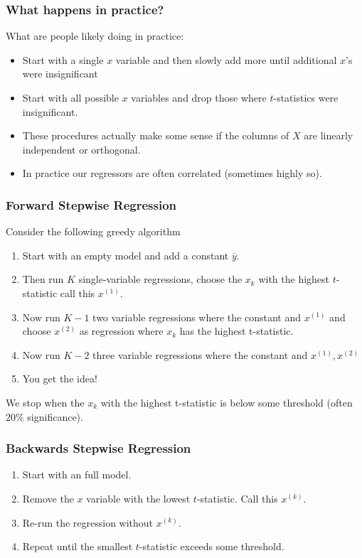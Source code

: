 \documentclass[xcolor=pdftex,dvipsnames,table,mathserif]{beamer}
\begin{document}
\begin{frame}
\frametitle{What happens in practice?}
What are people likely doing in practice:
\begin{itemize}
\item Start with a single $x$ variable and then slowly add more until additional $x$'s were insignificant
\item Start with all possible $x$ variables and drop those where $t$-statistics were insignificant.
\item These procedures actually make some sense if the columns of $X$ are \alert{linearly independent} or \alert{orthogonal}.
\item In practice our regressors are often correlated (sometimes highly so).
\end{itemize}
\end{frame}


\begin{frame}
\frametitle{Forward Stepwise Regression}
Consider the following \alert{greedy algorithm}
\begin{enumerate}
\item Start with an empty model and add a constant $\overline{y}$.
\item Then run $K$ single-variable regressions, choose the $x_k$ with the highest $t$-statistic call this $x^{(1)}$.
\item Now run $K-1$ two variable regressions where the constant and $x^{(1)}$ and choose $x^{(2)}$ as regression where $x_k$ has the highest t-statistic.
\item Now run $K-2$ three variable regressions where the constant and $x^{(1)},x^{(2)}$
\item You get the idea!
\end{enumerate}
We stop when the $x_k$ with the highest t-statistic is below some threshold (often 20\% significance).
\end{frame}


\begin{frame}
\frametitle{Backwards Stepwise Regression}
\begin{enumerate}
\item Start with an full model.
\item Remove the $x$ variable with the lowest $t$-statistic. Call this $x^{(k)}$.
\item Re-run the regression without $x^{(k)}$.
\item Repeat until the smallest $t$-statistic exceeds some threshold.
\end{enumerate}
\end{frame}
\end{document}
